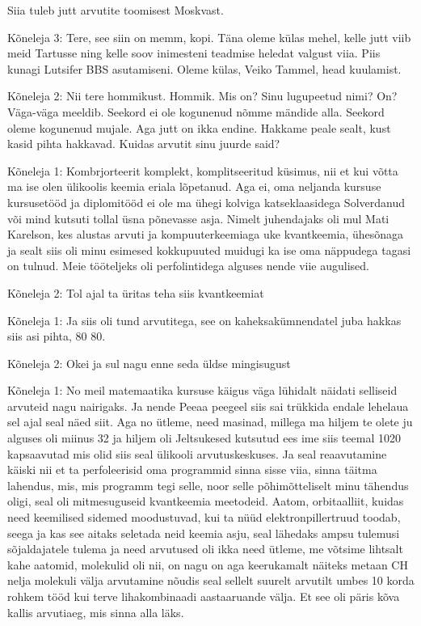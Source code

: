 \label{chptr:lucifer}

Siia tuleb jutt arvutite toomisest Moskvast\label{sisu!veiko_moskvas}.

                 
Kõneleja 3:
Tere, see siin on memm, kopi. Täna oleme külas mehel, kelle jutt viib meid Tartusse ning kelle soov inimesteni teadmise heledat valgust viia. Piis kunagi Lutsifer BBS asutamiseni. Oleme külas, Veiko Tammel, head kuulamist.
                 
Kõneleja 2:
Nii tere hommikust. Hommik. Mis on? Sinu lugupeetud nimi? On? Väga-väga meeldib. Seekord ei ole kogunenud nõmme mändide alla. Seekord oleme kogunenud mujale. Aga jutt on ikka endine. Hakkame peale sealt, kust kasid pihta hakkavad. Kuidas arvutit sinu juurde said?
                 
Kõneleja 1:
Kombrjorteerit komplekt, komplitseeritud küsimus, nii et kui võtta ma ise olen ülikoolis keemia eriala lõpetanud. Aga ei, oma neljanda kursuse kursusetööd ja diplomitööd ei ole ma ühegi kolviga katseklaasidega Solverdanud või mind kutsuti tollal üsna põnevasse asja. Nimelt juhendajaks oli mul Mati Karelson, kes alustas arvuti ja kompuuterkeemiaga uke kvantkeemia, ühesõnaga ja sealt siis oli minu esimesed kokkupuuted muidugi ka ise oma näppudega tagasi on tulnud. Meie tööteljeks oli perfolintidega alguses nende viie augulised.
                 
Kõneleja 2:
Tol ajal ta üritas teha siis kvantkeemiat
                 
Kõneleja 1:
Ja siis oli tund arvutitega, see on kaheksakümnendatel juba hakkas siis asi pihta, 80 80.
                 
Kõneleja 2:
Okei ja sul nagu enne seda üldse mingisugust
                 
Kõneleja 1:
No meil matemaatika kursuse käigus väga lühidalt näidati selliseid arvuteid nagu nairigaks. Ja nende Peeaa peegeel siis sai trükkida endale lehelaua sel ajal seal näed siit. Aga no ütleme, need masinad, millega ma hiljem te olete ju alguses oli miinus 32 ja hiljem oli Jeltsukesed kutsutud ees ime siis teemal 1020 kapsaavutad mis olid siis seal ülikooli arvutuskeskuses. Ja seal reaavutamine käiski nii et ta perfoleerisid oma programmid sinna sisse viia, sinna täitma lahendus, mis, mis programm tegi selle, noor selle põhimõtteliselt minu tähendus oligi, seal oli mitmesuguseid kvantkeemia meetodeid. Aatom, orbitaalliit, kuidas need keemilised sidemed moodustuvad, kui ta nüüd elektronpillertruud toodab, seega ja kas see aitaks seletada neid keemia asju, seal lähedaks ampsu tulemusi sõjaldajatele tulema ja need arvutused oli ikka need ütleme, me võtsime lihtsalt kahe aatomid, molekulid oli nii, on nagu on aga keerukamalt näiteks metaan CH nelja molekuli välja arvutamine nõudis seal sellelt suurelt arvutilt umbes 10 korda rohkem tööd kui terve lihakombinaadi aastaaruande välja. Et see oli päris kõva kallis arvutiaeg, mis sinna alla läks.
                 
